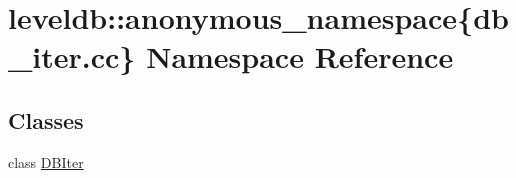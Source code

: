 \hypertarget{namespaceleveldb_1_1anonymous__namespace_02db__iter_8cc_03}{}\section{leveldb\+:\+:anonymous\+\_\+namespace\{db\+\_\+iter.\+cc\} Namespace Reference}
\label{namespaceleveldb_1_1anonymous__namespace_02db__iter_8cc_03}
\subsection*{Classes}
\begin{DoxyCompactItemize}
\item 
class \hyperlink{classleveldb_1_1anonymous__namespace_02db__iter_8cc_03_1_1_d_b_iter}{D\+B\+Iter}
\end{DoxyCompactItemize}
